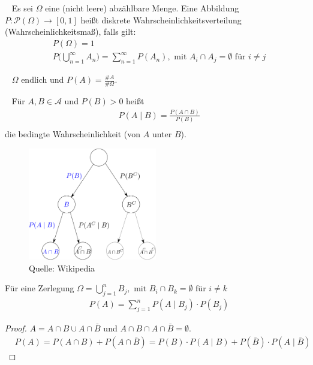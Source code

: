 \begin{Definition}~
Es sei $\Omega$ eine (nicht leere) abzählbare Menge. Eine Abbildung 
$P :\mathcal{P}(\Omega) \to [0,1]$ heißt diskrete Wahrscheinlichkeitsverteilung (Wahrscheinlichkeitsmaß), falls gilt:
\begin{align*}
& P(\Omega) = 1\\
& P \Biggl( \bigcup_{n=1}^{\infty} A_n \biggr)= \sum_{n=1}^{\infty} P(A_n), \text{ mit } A_i \cap A_j = \emptyset \text{ für } i \neq j 
\end{align*}
\end{Definition}


\begin{Beispiel}~
$\Omega$ endlich und $P(A) = \frac{\#A}{\#\Omega}$.
 \end{Beispiel}


\begin{Definition}~
Für $A,B \in \mathcal{A}$ und $P(B) > 0$ heißt
\begin{align*}
& P(A \; | \;  B) = \frac{P(A \cap B)}{P(B)} \\
\end{align*}
die bedingte Wahrscheinlichkeit (von $A$ unter $B$).
\end{Definition}


\begin{figure}[htp]
      \centering
    \includegraphics[width=0.5\textwidth]{images/Probability_tree}

      \caption{Quelle: Wikipedia}
\end{figure}



\begin{Satz}
Für eine Zerlegung  $\Omega = \bigcup_{j=1}^{n} B_j, \text{ mit } B_i \cap B_k = \emptyset \text{ für } i \neq k $
\begin{align*}
& P(A ) = \sum_{j=1}^{n}  P(A \; | \;  B_j) \cdot P(B_j)
\end{align*}
\end{Satz}
\begin{proof}
$A = A \cap B \cup A \cap \bar{B}$ und  $A \cap B \cap A \cap \bar{B} = \emptyset$. 
\begin{align*}
& P(A) =  P(A \cap B) + P(A \cap \bar{B}) = P(B) \cdot P(A  \; | \; B) + P(\bar{B}) \cdot P(A  \; | \; \bar{B}) 
\end{align*}
\end{proof}

